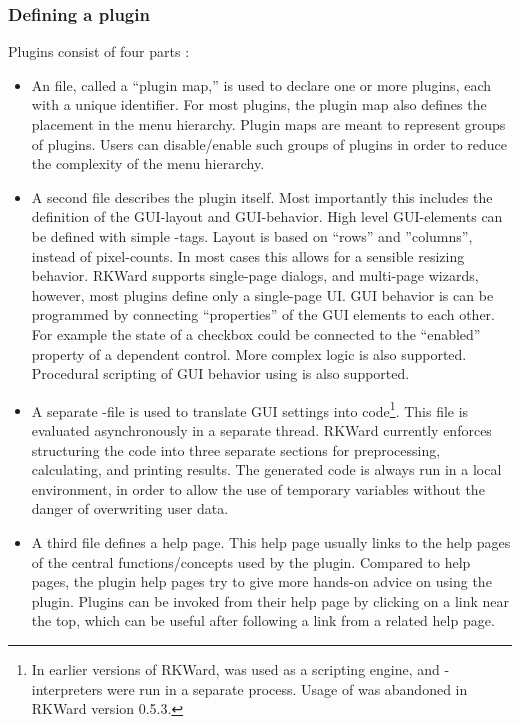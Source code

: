 \subsubsection{Defining a plugin}
\label{sec:technical_plugins_defining}
Plugins consist of four parts \citep[see Section~\ref{sec:example_plugin} for an example; for a complete
manual, see][]{Friedrichsmeier2010}:

\begin{itemize}
    \item
    An  file, called a ``plugin map,'' is used to declare one or more plugins, each
    with a unique identifier. For most plugins, the plugin map also defines the
    placement in the menu hierarchy. Plugin maps are meant to represent groups of
    plugins. Users can disable/enable such groups of plugins in order to reduce the
    complexity of the menu hierarchy.

    \item
    A second  file describes the plugin itself. Most importantly this includes
    the definition of the GUI-layout and GUI-behavior. High level GUI-elements can
    be defined with simple -tags. Layout is based on ``rows'' and ''columns'',
    instead of pixel-counts. In most cases this allows for a sensible resizing
    behavior. RKWard supports single-page dialogs, and multi-page wizards, however,
    most plugins define only a single-page UI. GUI behavior is can be programmed by
    connecting ``properties'' of the GUI elements to each other. For example the state
    of a checkbox could be connected to the ``enabled'' property of a dependent
    control. More complex logic is also supported. Procedural scripting of GUI
    behavior using  is also supported.

    \item
    A separate -file is used to translate GUI settings into 
    code\footnote{
        In earlier versions of RKWard,  was used
        as a scripting engine, and -interpreters were run in a separate process.
        Usage of  was abandoned in RKWard version 0.5.3.
    }. This  file is evaluated asynchronously in a separate thread. RKWard
    currently enforces structuring the code into three separate sections for
    preprocessing, calculating, and printing results. The generated code is always
    run in a local environment, in order to allow the use of temporary variables
    without the danger of overwriting user data.

    \item
    A third  file defines a help page. This help page usually links to the  help
    pages of the central functions/concepts used by the plugin. Compared to  help
    pages, the plugin help pages try to give more hands-on advice on using the
    plugin. Plugins can be invoked from their help page by clicking on a link near
    the top, which can be useful after following a link from a related help page.
\end{itemize}

